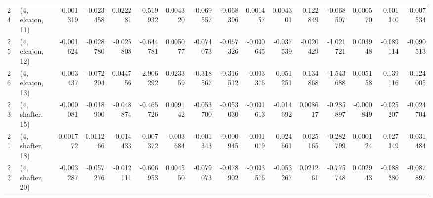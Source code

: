 \begin{tabular}{llrrrrrrrrrrrrrr}
24 &  (4, elcajon, 11) &  -0.001319 & -0.023458 &  0.022281 &  -0.519932 &  0.004320 &  -0.069557 & -0.068396 &  0.001457 &  0.004301 & -0.122849 &  -0.068507 &  0.000570 & -0.001340 & -0.007534 \\
25 &  (4, elcajon, 12) &  -0.001624 & -0.028780 & -0.025808 &  -0.644781 &  0.005077 &  -0.074073 & -0.067326 & -0.000645 & -0.037539 & -0.020429 &  -1.021721 &  0.003948 & -0.089114 & -0.090513 \\
26 &  (4, elcajon, 13) &  -0.003437 & -0.072204 &  0.044756 &  -2.906292 &  0.023359 &  -0.318567 & -0.316512 & -0.003376 & -0.051251 & -0.134868 &  -1.543688 &  0.005158 & -0.139116 & -0.124005 \\
23 &  (4, shafter, 15) &  -0.000081 & -0.018900 & -0.048874 &  -0.465726 &  0.009142 &  -0.053700 & -0.053030 & -0.001613 & -0.014692 &  0.008617 &  -0.285897 & -0.000849 & -0.025207 & -0.024704 \\
21 &  (4, shafter, 18) &   0.001772 &  0.011266 & -0.014433 &  -0.007372 & -0.003684 &  -0.001343 & -0.000945 & -0.001079 & -0.024661 & -0.025165 &  -0.282799 &  0.000124 & -0.027349 & -0.031484 \\
22 &  (4, shafter, 20) &  -0.003287 & -0.057276 & -0.012111 &  -0.606953 &  0.004550 &  -0.079073 & -0.078902 & -0.003576 & -0.053267 &  0.021261 &  -0.775748 &  0.002943 & -0.088280 & -0.087897 \\
\bottomrule
\end{tabular}
